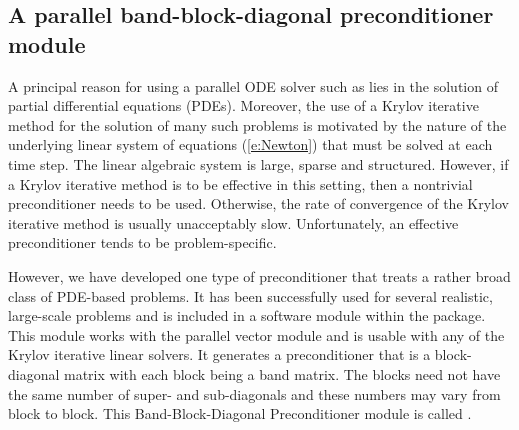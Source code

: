 
\subsection{A parallel band-block-diagonal preconditioner module}
\label{sss:cvbbdpre}

A principal reason for using a parallel ODE solver such as {\cvodes} lies
in the solution of partial differential equations (PDEs).  Moreover,
the use of a Krylov iterative method for the solution of many such
problems is motivated by the nature of the underlying linear system of
equations (\ref{e:Newton}) that must be solved at each time step.  The
linear algebraic system is large, sparse and structured. However, if
a Krylov iterative method is to be effective in this setting, then a
nontrivial preconditioner needs to be used.  Otherwise, the rate of
convergence of the Krylov iterative method is usually unacceptably
slow.  Unfortunately, an effective preconditioner tends to be
problem-specific.

However, we have developed one type of preconditioner that treats a
rather broad class of PDE-based problems.  It has been successfully
used for several realistic, large-scale problems \cite{HiTa:98} and is
included in a software module within the {\cvodes} package. This module
works with the parallel vector module {\nvecp} and is usable with any of
the Krylov iterative linear solvers.  It generates a preconditioner
that is a block-diagonal matrix with each block being a band matrix.
The blocks need not have the same number of super- and sub-diagonals
and these numbers may vary from block to block. This Band-Block-Diagonal
Preconditioner module is called {\cvbbdpre}.

